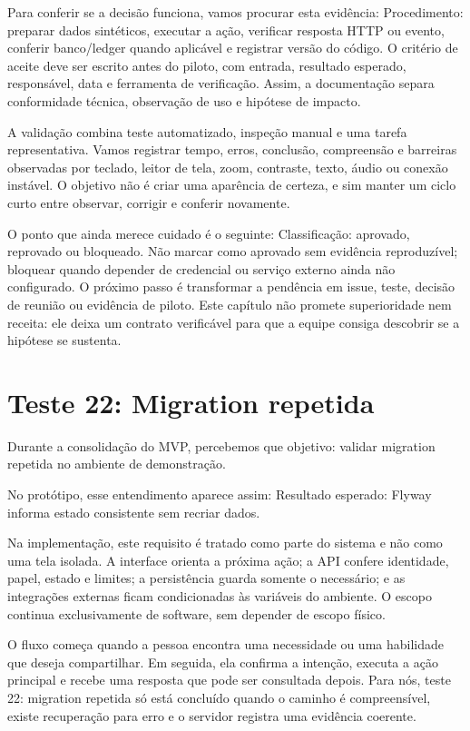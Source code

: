 \documentclass[12pt,oneside,a4paper,article]{abntex2}
\begin{document}
Para conferir se a decisão funciona, vamos procurar esta evidência: Procedimento: preparar dados sintéticos, executar a ação, verificar resposta HTTP ou evento, conferir banco/ledger quando aplicável e registrar versão do código. O critério de aceite deve ser escrito antes do piloto, com entrada, resultado esperado, responsável, data e ferramenta de verificação. Assim, a documentação separa conformidade técnica, observação de uso e hipótese de impacto.

A validação combina teste automatizado, inspeção manual e uma tarefa representativa. Vamos registrar tempo, erros, conclusão, compreensão e barreiras observadas por teclado, leitor de tela, zoom, contraste, texto, áudio ou conexão instável. O objetivo não é criar uma aparência de certeza, e sim manter um ciclo curto entre observar, corrigir e conferir novamente.

O ponto que ainda merece cuidado é o seguinte: Classificação: aprovado, reprovado ou bloqueado. Não marcar como aprovado sem evidência reproduzível; bloquear quando depender de credencial ou serviço externo ainda não configurado. O próximo passo é transformar a pendência em issue, teste, decisão de reunião ou evidência de piloto. Este capítulo não promete superioridade nem receita: ele deixa um contrato verificável para que a equipe consiga descobrir se a hipótese se sustenta.

\section{Teste 22: Migration repetida}
Durante a consolidação do MVP, percebemos que objetivo: validar migration repetida no ambiente de demonstração.

No protótipo, esse entendimento aparece assim: Resultado esperado: Flyway informa estado consistente sem recriar dados.

Na implementação, este requisito é tratado como parte do sistema e não como uma tela isolada. A interface orienta a próxima ação; a API confere identidade, papel, estado e limites; a persistência guarda somente o necessário; e as integrações externas ficam condicionadas às variáveis do ambiente. O escopo continua exclusivamente de software, sem depender de escopo físico.

O fluxo começa quando a pessoa encontra uma necessidade ou uma habilidade que deseja compartilhar. Em seguida, ela confirma a intenção, executa a ação principal e recebe uma resposta que pode ser consultada depois. Para nós, teste 22: migration repetida só está concluído quando o caminho é compreensível, existe recuperação para erro e o servidor registra uma evidência coerente.
\end{document}
